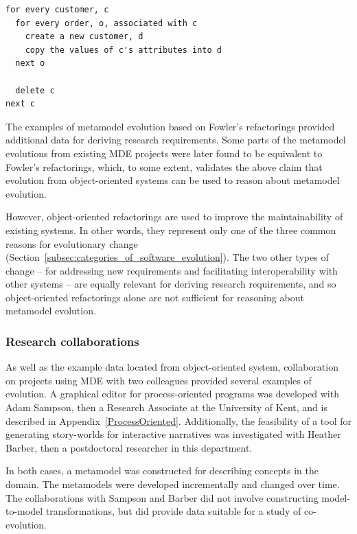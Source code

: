 \begin{lstlisting}[caption=Pseudo code migration strategy for the refactoring in Figure~\ref{fig:refactoring}., label=lst:refactoring]
for every customer, c
  for every order, o, associated with c
    create a new customer, d
    copy the values of c's attributes into d
  next o
	
  delete c
next c
\end{lstlisting}

The examples of metamodel evolution based on Fowler's refactorings provided additional data for deriving research requirements. Some parts of the metamodel evolutions from existing MDE projects were later found to be equivalent to Fowler's refactorings, which, to some extent, validates the above claim that evolution from object-oriented systems can be used to reason about metamodel evolution.

However, object-oriented refactorings are used to improve the maintainability of existing systems. In \cc other words, they represent only one of the three common reasons for evolutionary change (Section~\ref{subsec:categories_of_software_evolution}). The two other types of change -- for addressing new requirements and facilitating interoperability with other systems -- are equally relevant for deriving research requirements, and so object-oriented refactorings alone are not sufficient for reasoning about metamodel evolution.

\subsubsection{Research collaborations}
As well as the example data located from object-oriented system, collaboration on projects using MDE with two colleagues provided several examples of evolution. A graphical editor for process-oriented programs was developed with Adam Sampson, then a Research Associate at the University of Kent, and is described in Appendix~\ref{ProcessOriented}. Additionally, the feasibility of a tool for generating story-worlds for interactive narratives was investigated with Heather Barber, then a postdoctoral researcher in this department.

In both cases, a metamodel was constructed for describing concepts in the domain. The metamodels were developed incrementally and changed over time. The collaborations with Sampson and Barber did not involve constructing model-to-model transformations, but did provide data suitable for a study of co-evolution.

